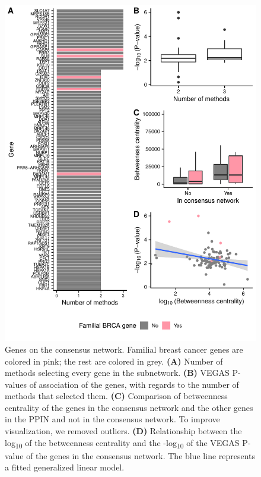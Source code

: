 \documentclass[twocolumn, 10pt]{article}
\begin{document}
\begin{figure}[htbp]
\centering
\includegraphics[width=\textwidth,height=\textheight,keepaspectratio]{./figures/sfigure_8.pdf}
\caption{\label{sfig:consensus_stats}
Genes on the consensus network. Familial breast cancer genes are colored in pink; the rest are colored in grey. \textbf{(A)} Number of methods selecting every gene in the subnetwork. \textbf{(B)} VEGAS P-values of association of the genes, with regards to the number of methods that selected them. \textbf{(C)} Comparison of betweenness centrality of the genes in the consensus network and the other genes in the PPIN and not in the consensus network. To improve visualization, we removed outliers. \textbf{(D)} Relationship between the log\textsubscript{10} of the betweenness centrality and the -log\textsubscript{10} of the VEGAS P-value of the genes in the consensus network. The blue line represents a fitted generalized linear model.}
\end{figure}
\end{document}

